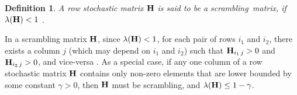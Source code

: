 \documentclass[letterpaper, 12pt]{article}
\newenvironment{proof}{\paragraph{\bf Proof:}}{\hspace*{\fill}\(\Box\)}
\newcommand{\comment}[1]{}
\newtheorem{definition}{Definition}
\newtheorem{lemma}{Lemma}
\begin{document}
\begin{definition}
A row stochastic
 matrix $\bfH$ is said to be a {\em scrambling}\, matrix, if $\lambda({\bf H})<1$
{\normalfont \cite{Hajnal58,Wolfowitz}}.
\end{definition}

In a scrambling matrix $\bfH$, since $\lambda({\bf H})<1$, for each pair of
rows $i_1$ and $i_2$, there exists a column $j$ (which may depend on
$i_1$ and $i_2$) such that
 ${\bf H}_{i_1\,j}>0$ and ${\bf H}_{i_2\,j}>0$, and vice-versa \cite{Hajnal58,Wolfowitz}.
As a special case, if any one column of a row stochastic matrix $\bfH$
contains only non-zero elements that are lower bounded by some
constant $\gamma>0$, then $\bfH$ must be scrambling, and $\lambda({\bf H})\leq 1-\gamma$. 

\comment{======================
\begin{definition}
\label{d_type}
Two matrices of identical size are said to be of the same ``type'' if
they contain non-zero elements in identical positions.
\end{definition}
Let us denote by $\T{\bfH}$ the {\em type} of matrix $\bfH$.
A partial order can be
defined on the matrix types. Specifically, for matrices $\bfH$ and $\bfK$,
$\T{\bfH}\leq \T{\bfK}$ provided that matrix $\bfK$ is non-zero in each position
where $\bfH$ is non-zero.

\begin{lemma}
\label{l_scambling_1}
For any two row stochastic matrices $\bfH,~\bfK$ of the same size,
if $\T{\bfH}\leq \T{\bfK}$ and $\bfH$ is a scrambling matrix,
then $\bfK$ is a scrambling matrix.
\end{lemma}
\begin{proof}
Follows immediately from the definition of matrix {\em type}
and {\em scrambling} matrices.
\end{proof}

~

\begin{lemma}
\label{l_scrambling_2}
Consider a sequence $\bfH(1),\bfH(2),\cdots,\bfH(t)$ of square row stochastic matrices
with non-zero diagonals. For any subset $N$ of $\{1,2,\cdots,t\}$,
\[
\T{\Pi_{i\in N} \bfH(i)} ~ \leq ~ \T{\Pi_{1\leq i\leq t} \bfH(i)}
\]
\end{lemma}
\begin{proof}
The proof follows from the definition of matrix {\em type}, and the fact
the row stochastic matrices above have non-zero diagonals. 
\end{proof}

~
=================================================}
\end{document}
